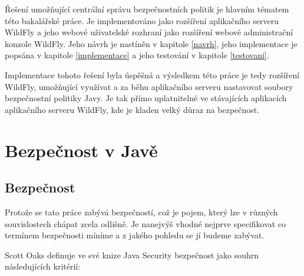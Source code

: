 Řešení umožňující centrální správu bezpečnostních politik je hlavním tématem této bakalářské práce.
Je implementováno jako rozšíření aplikačního serveru WildFly a jeho webové uživatelské rozhraní jako rozšíření webové administrační konzole WildFly.
Jeho návrh je nastíněn v kapitole \ref{navrh}, jeho implementace je popsána v kapitole \ref{implementace} a jeho testování v kapitole \ref{testovani}.

Implementace tohoto řešení byla úspěšná a výsledkem této práce je tedy rozšíření WildFly, umožňující využívat a za běhu aplikačního serveru
nastavovat soubory bezpečnostní politiky Javy.
Je tak přímo uplatnitelné ve stávajících aplikacích aplikačního serveru WildFly, kde je kladen velký důraz na bezpečnost.

\chapter{Bezpečnost v Javě} \label{teoretickyUvod}

\section{Bezpečnost}

Protože se tato práce zabývá bezpečností, což je pojem, který lze v různých souvislostech chápat zcela odlišně. Je nanejvýš vhodné nejprve specifikovat co termínem bezpečnosti míníme a z jakého pohledu se jí budeme zabývat.

Scott Oaks definuje ve své knize Java Security bezpečnost jako souhrn následujících kritérií: \cite[1.1]{oaks}

